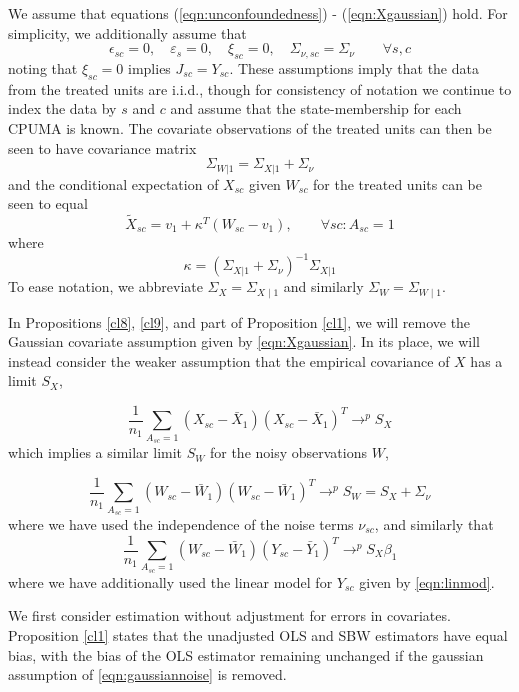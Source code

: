 \documentclass[aoas]{imsart}
\theoremstyle{plain}
\theoremstyle{remark}
\begin{document}
\begin{appendix}
We assume that equations (\ref{eqn:unconfoundedness}) - (\ref{eqn:Xgaussian}) hold. For simplicity, we additionally assume that
\begin{equation}\label{eqn:simplifications}
\epsilon_{sc} = 0, \quad \varepsilon_s = 0,\quad \xi_{sc} = 0,\quad  \Sigma_{\nu,sc} = \Sigma_\nu \qquad \forall s,c
\end{equation}
noting that $\xi_{sc}=0$ implies $J_{sc} = Y_{sc}$. These assumptions imply that the data from the treated units are i.i.d., though for consistency of notation we continue to index the data by $s$ and $c$ and assume that the state-membership for each CPUMA is known. The covariate observations of the treated units can then be seen to have covariance matrix
\[ \Sigma_{W|1} = \Sigma_{X|1} + \Sigma_\nu\]
and the conditional expectation of $X_{sc}$ given $W_{sc}$ for the treated units can be seen to equal
\[ \tilde{X}_{sc} = v_1 + \kappa^T (W_{sc} - v_1), \qquad \forall sc: A_{sc}=1\]
where
\[ \kappa = (\Sigma_{X|1} + \Sigma_{\nu})^{-1} \Sigma_{X|1}\]
To ease notation, we abbreviate $\Sigma_X = \Sigma_{X \mid 1}$ and similarly $ \Sigma_W = \Sigma_{W \mid 1}$. 

In Propositions \ref{cl8}, \ref{cl9}, and part of Proposition \ref{cl1}, we will remove the Gaussian covariate assumption given by \eqref{eqn:Xgaussian}. In its place, we will instead consider the weaker assumption that the empirical covariance of $X$ has a limit $S_X$,

\begin{equation}\label{eqn:limitX}
 \frac{1}{n_1} \sum_{A_{sc}=1} (X_{sc} - \bar{X}_1)(X_{sc} - \bar{X}_1)^T \rightarrow^p S_X
\end{equation}
which implies a similar limit $S_W$ for the noisy observations $W$,

\begin{equation}\label{eqn:limitW}
 \frac{1}{n_1} \sum_{A_{sc}=1} (W_{sc} - \bar{W}_1)(W_{sc} - \bar{W}_1)^T \rightarrow^p S_W = S_X + \Sigma_{\nu}
\end{equation}
where we have used the independence of the noise terms $\nu_{sc}$, and similarly that 
\begin{equation}\label{eqn:limitWY}
 \frac{1}{n_1} \sum_{A_{sc}=1} (W_{sc} - \bar{W}_1)(Y_{sc} - \bar{Y}_1)^T \rightarrow^p S_X \beta_1
\end{equation}
where we have additionally used the linear model for $Y_{sc}$ given by \eqref{eqn:linmod}.

We first consider estimation without adjustment for errors in covariates. 
Proposition \ref{cl1} states that the unadjusted OLS and SBW estimators have equal bias, with the bias of the OLS estimator remaining unchanged if the gaussian assumption of \eqref{eqn:gaussiannoise} is removed.


\end{appendix}
\end{document}
